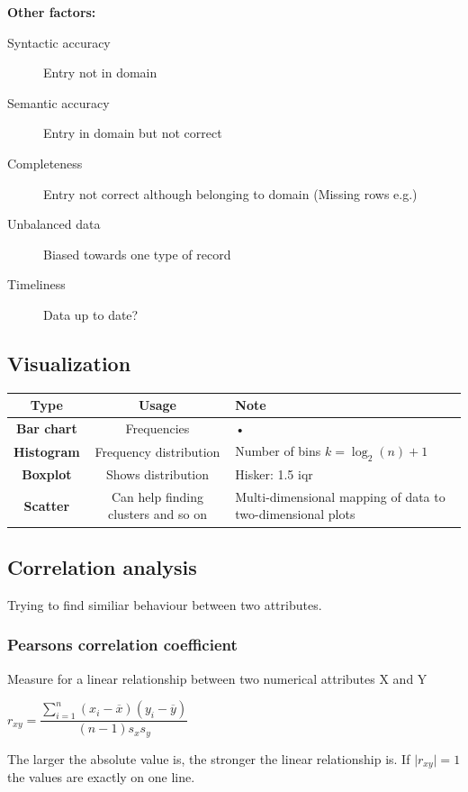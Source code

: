 \documentclass[fleqn, oneside, 10pt, titlepage]{article}
\begin{document}
\textbf{Other factors:}
\begin{description}
	\item[Syntactic accuracy] Entry not in domain
	\item[Semantic accuracy] Entry in domain but not correct
	\item[Completeness] Entry not correct although belonging to domain (Missing rows e.g.)
	\item[Unbalanced data] Biased towards one type of record
	\item[Timeliness] Data up to date?
\end{description}

\subsection{Visualization}
\begin{tabular}{|c|c|p{7cm}|}
\hline 
\textbf{Type} & \textbf{Usage} & \textbf{Note} \\ 
\hline 
\textbf{Bar chart} & Frequencies & • \\ 
\hline 
\textbf{Histogram} & Frequency distribution & Number of bins $k = \log_2(n) + 1$ \\ 
\hline 
\textbf{Boxplot} & Shows distribution & Hisker: 1.5 iqr \\ 
\hline 
\textbf{Scatter} & Can help finding clusters and so on & Multi-dimensional mapping of data to two-dimensional plots \\ 
\hline 
\end{tabular} 

\subsection{Correlation analysis}
Trying to find similiar behaviour between two attributes.

\subsubsection{Pearsons correlation coefficient}
Measure for a linear relationship between two numerical attributes X and Y

\begin{center}
	$r_{xy} = \dfrac{\sum_{i=1}^n (x_i - \overline{x}) (y_i - \overline{y})}{(n-1) s_x s_y}$
\end{center}
The larger the absolute value is, the stronger the linear relationship is. If $\mid r_{xy} \mid = 1$ the values are exactly on one line.
\end{document}
